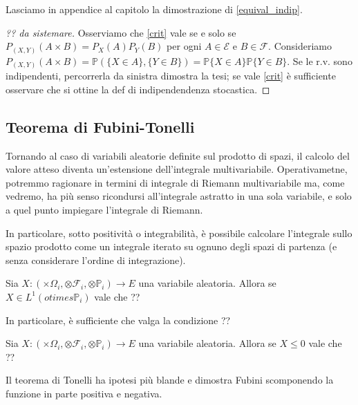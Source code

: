 Lasciamo in appendice al capitolo la dimostrazione di \ref{equival_indip}.

\begin{proof}[?? da sistemare]
	Osserviamo che \ref{crit} vale se e solo se $P_{(X,Y)} (A \times B) = P_X(A) P_Y(B)$ per ogni $A\in\mathcal{E}$ e $B\in\mathcal{F}$. Consideriamo $P_{(X,Y)} (A \times B) = \mathbb{P}(\{X \in A\},\{Y \in B\}) = \mathbb{P}\{X \in A\} \mathbb{P} \{Y \in B\}$. Se le r.v. sono indipendenti, percorrerla da sinistra dimostra la tesi; se vale \ref{crit} è sufficiente osservare che si ottine la def di indipendendenza stocastica.
\end{proof}

\subsection{Teorema di Fubini-Tonelli}

Tornando al caso di variabili aleatorie definite sul prodotto di spazi, il calcolo del valore atteso diventa un'estensione dell'integrale multivariabile. 
Operativametne, potremmo ragionare in termini di integrale di Riemann multivariabile ma, come vedremo, ha più senso ricondursi all'integrale astratto in una sola variabile, e solo a quel punto impiegare l'integrale di Riemann.

In particolare, sotto positività o integrabilità, è possibile calcolare l'integrale sullo spazio prodotto come un integrale iterato su ognuno degli spazi di partenza (e senza considerare l'ordine di integrazione).

\begin{my_theorem}[Fubini]
	Sia $X:(\times \Omega_i, \otimes \mathcal{F}_i, \otimes \mathbb{P}_i) \to E$ una variabile aleatoria. Allora se $X \in L^1(otimes \mathbb{P}_i)$ vale che
	??
\end{my_theorem}

In particolare, è sufficiente che valga la condizione ?? 

\begin{my_theorem}[Tonelli]
	Sia $X:(\times \Omega_i, \otimes \mathcal{F}_i, \otimes \mathbb{P}_i) \to E$ una variabile aleatoria. Allora se $X \leq 0$ vale che
	??	
\end{my_theorem}

Il teorema di Tonelli ha ipotesi più blande e dimostra Fubini scomponendo la funzione in parte positiva e negativa.

